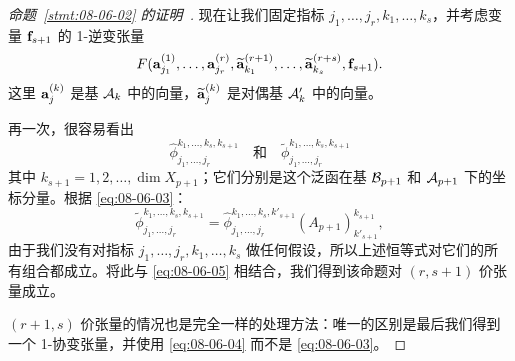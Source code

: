 \begin{proof}[\normalfont\heiti 命题~\ref{stmt:08-06-02} 的证明~\nopunct]
现在让我们固定指标 $j_1, \dots, j_r, k_1, \dots, k_s$，并考虑变量 $\mathbf{f}_{s+1}$ 的 1-逆变张量 $$F(\mathbf{a}^{(1)}_{j_1}, \dots, \mathbf{a}^{(r)}_{j_r}, \widetilde{\mathbf{a}}^{(r+1)}_{k_1}, \dots, \widetilde{\mathbf{a}}^{(r+s)}_{k_s}, \mathbf{f}_{s+1}).$$
这里 $\mathbf{a}^{(k)}_j$ 是基 $\mathcal{A}_k$ 中的向量，$\widetilde{\mathbf{a}}^{(k)}_j$ 是对偶基 $\mathcal{A}'_k$ 中的向量。

再一次，很容易看出
$$\hat{\phi}^{k_1, \dots, k_s, k_{s+1}}_{j_1, \dots, j_r}\quad \text{和} \quad \widetilde{\phi}^{k_1, \dots, k_s, k_{s+1}}_{j_1, \dots, j_r}$$
其中 $k_{s+1}=1,2,\dots,\dim X_{p+1}$；它们分别是这个泛函在基 $\mathcal{B}_{p+1}$ 和 $\mathcal{A}_{p+1}$ 下的坐标分量。根据 \eqref{eq:08-06-03}：
$$ \widetilde{\phi}^{k_1, \dots, k_s, k_{s+1}}_{j_1, \dots, j_r} = \hat{\phi}^{k_1, \dots, k_s, k'_{s+1}}_{j_1, \dots, j_r} (A_{p+1})^{k_{s+1}}_{k'_{s+1}}, $$
由于我们没有对指标 $j_1, \dots, j_r, k_1, \dots, k_s$ 做任何假设，所以上述恒等式对它们的所有组合都成立。将此与 \eqref{eq:08-06-05} 相结合，我们得到该命题对 $(r, s+1)$ 价张量成立。

$(r+1, s)$ 价张量的情况也是完全一样的处理方法：唯一的区别是最后我们得到一个 1-协变张量，并使用 \eqref{eq:08-06-04} 而不是 \eqref{eq:08-06-03}。\end{proof}



